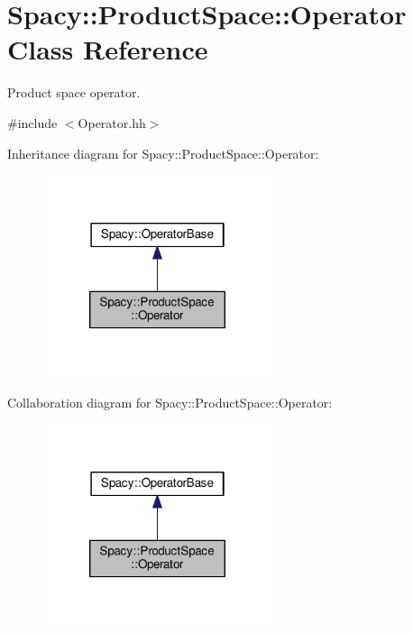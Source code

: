 \hypertarget{classSpacy_1_1ProductSpace_1_1Operator}{\section{Spacy\-:\-:Product\-Space\-:\-:Operator Class Reference}
\label{classSpacy_1_1ProductSpace_1_1Operator}
}


Product space operator.  




{\ttfamily \#include $<$Operator.\-hh$>$}



Inheritance diagram for Spacy\-:\-:Product\-Space\-:\-:Operator\-:
\nopagebreak
\begin{figure}[H]
\begin{center}
\leavevmode
\includegraphics[width=190pt]{classSpacy_1_1ProductSpace_1_1Operator__inherit__graph}
\end{center}
\end{figure}


Collaboration diagram for Spacy\-:\-:Product\-Space\-:\-:Operator\-:
\nopagebreak
\begin{figure}[H]
\begin{center}
\leavevmode
\includegraphics[width=190pt]{classSpacy_1_1ProductSpace_1_1Operator__coll__graph}
\end{center}
\end{figure}
